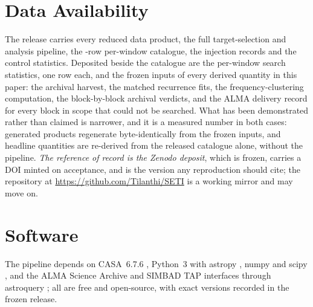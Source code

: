\section*{Data Availability}
\label{sec:data}
The release carries every reduced data product, the full
target-selection and analysis pipeline, the \NWindows-row per-window
catalogue, the injection records and the control statistics. Deposited
beside the catalogue are the per-window search statistics, one row each,
and the frozen inputs of every derived quantity in this paper: the
archival harvest, the matched recurrence fits, the frequency-clustering
computation, the block-by-block archival verdicts, and the ALMA delivery
record for every block in scope that could not be searched. What has been
demonstrated rather than claimed is narrower, and it is a measured number
in both cases: \NRegenProducts{} generated products regenerate
byte-identically from the frozen inputs, and \NReproChecks{} headline
quantities are re-derived from the released catalogue alone, without the
pipeline. \emph{The reference of record is the Zenodo deposit}, which is
frozen, carries a DOI minted on acceptance, and is the version any
reproduction should cite; the repository at
\url{https://github.com/Tilanthi/SETI} is a working mirror and may move on.

\section*{Software}
The pipeline depends on CASA~6.7.6 \citep[casatools/casatasks
6.7.6-14;][]{CASA2022}, Python~3 with astropy \citep{Astropy2022}, numpy
\citep{Harris2020} and scipy \citep{Virtanen2020}, and the ALMA Science
Archive and SIMBAD TAP interfaces through astroquery \citep{Ginsburg2019};
all are free and open-source, with exact
versions recorded in the frozen release.

